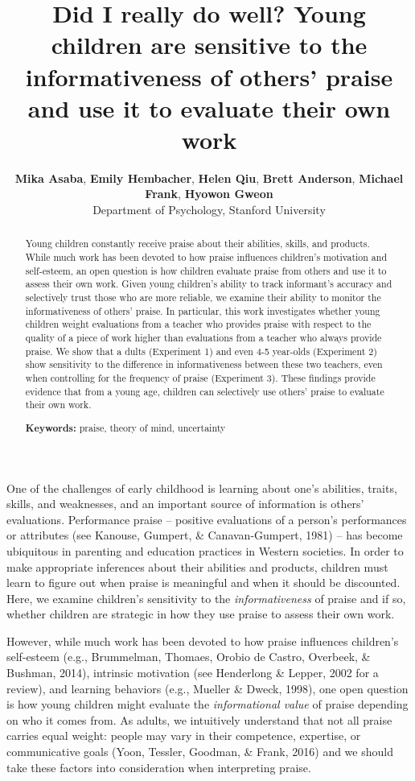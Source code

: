 \documentclass[10pt, letterpaper]{article}
\title{Did I really do well? Young children are sensitive to the
informativeness of others' praise and use it to evaluate their own work}
\author{{\large \bf Mika Asaba},  {\large \bf Emily Hembacher}, {\large \bf Helen Qiu}, {\large \bf Brett Anderson}, {\large \bf Michael Frank}, {\large \bf Hyowon Gweon} \\ Department of Psychology, Stanford University}
\begin{document}
\maketitle

\begin{abstract}
Young children constantly receive praise about their abilities, skills,
and products. While much work has been devoted to how praise influences
children's motivation and self-esteem, an open question is how children
evaluate praise from others and use it to assess their own work. Given
young children's ability to track informant's accuracy and selectively
trust those who are more reliable, we examine their ability to monitor
the informativeness of others' praise. In particular, this work
investigates whether young children weight evaluations from a teacher
who provides praise with respect to the quality of a piece of work
higher than evaluations from a teacher who always provide praise. We
show that a dults (Experiment 1) and even 4-5 year-olds (Experiment 2)
show sensitivity to the difference in informativeness between these two
teachers, even when controlling for the frequency of praise (Experiment
3). These findings provide evidence that from a young age, children can
selectively use others' praise to evaluate their own work.

\textbf{Keywords:}
praise, theory of mind, uncertainty
\end{abstract}

One of the challenges of early childhood is learning about one's
abilities, traits, skills, and weaknesses, and an important source of
information is others' evaluations. Performance praise -- positive
evaluations of a person's performances or attributes (see Kanouse,
Gumpert, \& Canavan-Gumpert, 1981) -- has become ubiquitous in parenting
and education practices in Western societies. In order to make
appropriate inferences about their abilities and products, children must
learn to figure out when praise is meaningful and when it should be
discounted. Here, we examine children's sensitivity to the
\textit{informativeness} of praise and if so, whether children are
strategic in how they use praise to assess their own work.

However, while much work has been devoted to how praise influences
children's self-esteem (e.g., Brummelman, Thomaes, Orobio de Castro,
Overbeek, \& Bushman, 2014), intrinsic motivation (see Henderlong \&
Lepper, 2002 for a review), and learning behaviors (e.g., Mueller \&
Dweck, 1998), one open question is how young children might evaluate the
\textit{informational value} of praise depending on who it comes from.
As adults, we intuitively understand that not all praise carries equal
weight: people may vary in their competence, expertise, or communicative
goals (Yoon, Tessler, Goodman, \& Frank, 2016) and we should take these
factors into consideration when interpreting praise.
\end{document}
